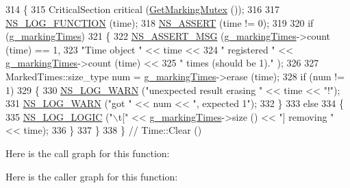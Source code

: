\begin{DoxyCode}
314 \{
315   CriticalSection critical (\hyperlink{namespacens3_ac4356aa982bd2ddb0f7ebbf94539919d}{GetMarkingMutex} ());
316 
317   \hyperlink{log-macros-disabled_8h_a90b90d5bad1f39cb1b64923ea94c0761}{NS\_LOG\_FUNCTION} (time);
318   \hyperlink{assert_8h_a6dccdb0de9b252f60088ce281c49d052}{NS\_ASSERT} (time != 0);
319 
320   \textcolor{keywordflow}{if} (\hyperlink{classns3_1_1Time_aa01dcd3b61742fd80eedd17834497ab7}{g\_markingTimes})
321     \{
322       \hyperlink{assert_8h_aff5ece9066c74e681e74999856f08539}{NS\_ASSERT\_MSG} (\hyperlink{classns3_1_1Time_aa01dcd3b61742fd80eedd17834497ab7}{g\_markingTimes}->count (time) == 1,
323                      \textcolor{stringliteral}{"Time object "} << time <<
324                      \textcolor{stringliteral}{" registered "} << \hyperlink{classns3_1_1Time_aa01dcd3b61742fd80eedd17834497ab7}{g\_markingTimes}->count (time) <<
325                      \textcolor{stringliteral}{" times (should be 1)."} );
326 
327       MarkedTimes::size\_type num = \hyperlink{classns3_1_1Time_aa01dcd3b61742fd80eedd17834497ab7}{g\_markingTimes}->erase (time);
328       \textcolor{keywordflow}{if} (num != 1)
329         \{
330           \hyperlink{group__logging_gade7208b4009cdf0e25783cd26766f559}{NS\_LOG\_WARN} (\textcolor{stringliteral}{"unexpected result erasing "} << time << \textcolor{stringliteral}{"!"});
331           \hyperlink{group__logging_gade7208b4009cdf0e25783cd26766f559}{NS\_LOG\_WARN} (\textcolor{stringliteral}{"got "} << num << \textcolor{stringliteral}{", expected 1"});
332         \}
333       \textcolor{keywordflow}{else}
334         \{
335           \hyperlink{group__logging_ga88acd260151caf2db9c0fc84997f45ce}{NS\_LOG\_LOGIC} (\textcolor{stringliteral}{"\(\backslash\)t["} << \hyperlink{classns3_1_1Time_aa01dcd3b61742fd80eedd17834497ab7}{g\_markingTimes}->size () << \textcolor{stringliteral}{"] removing  "} << 
      time);
336         \}
337     \}
338 \}  \textcolor{comment}{// Time::Clear ()}
\end{DoxyCode}


Here is the call graph for this function\+:




Here is the caller graph for this function\+:



